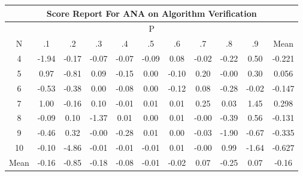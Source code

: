 \documentclass[11pt,a4paper]{report}
\begin{document}
\begin{longtable}{ | c || c | c | c | c | c | c | c | c | c || c |}
\hline
\multicolumn{11}{|c|}{ Score Report For ANA on Algorithm Verification} \\
\hline
\multicolumn{11}{|c|}{ P } \\
\hline
N & .1 & .2 & .3 & .4 & .5 & .6 & .7 & .8 & .9 & Mean\\
 \hline
 \hline
 \endhead
  4 &  \cellcolor[HTML]{FFCFCF} -1.94 &  \cellcolor[HTML]{FFF7F7} -0.17 &  \cellcolor[HTML]{FFFFFF} -0.07 &  \cellcolor[HTML]{FFFFFF} -0.07 &  \cellcolor[HTML]{FFFFFF} -0.09 &  \cellcolor[HTML]{FFFFFF} 0.08 &  \cellcolor[HTML]{FFFFFF} -0.02 &  \cellcolor[HTML]{FFF7F7} -0.22 &  \cellcolor[HTML]{EFEFFF} 0.50 & -0.221 \\
  5 &  \cellcolor[HTML]{E7E7FF} 0.97 &  \cellcolor[HTML]{FFE7E7} -0.81 &  \cellcolor[HTML]{FFFFFF} 0.09 &  \cellcolor[HTML]{FFFFFF} -0.15 &  \cellcolor[HTML]{FFFFFF} 0.00 &  \cellcolor[HTML]{FFFFFF} -0.10 &  \cellcolor[HTML]{F7F7FF} 0.20 &  \cellcolor[HTML]{FFFFFF} -0.00 &  \cellcolor[HTML]{F7F7FF} 0.30 & 0.056 \\
  6 &  \cellcolor[HTML]{FFEFEF} -0.53 &  \cellcolor[HTML]{FFF7F7} -0.38 &  \cellcolor[HTML]{FFFFFF} 0.00 &  \cellcolor[HTML]{FFFFFF} -0.08 &  \cellcolor[HTML]{FFFFFF} 0.00 &  \cellcolor[HTML]{FFFFFF} -0.12 &  \cellcolor[HTML]{FFFFFF} 0.08 &  \cellcolor[HTML]{FFF7F7} -0.28 &  \cellcolor[HTML]{FFFFFF} -0.02 & -0.147 \\
  7 &  \cellcolor[HTML]{E7E7FF} 1.00 &  \cellcolor[HTML]{FFF7F7} -0.16 &  \cellcolor[HTML]{FFFFFF} 0.10 &  \cellcolor[HTML]{FFFFFF} -0.01 &  \cellcolor[HTML]{FFFFFF} 0.01 &  \cellcolor[HTML]{FFFFFF} 0.01 &  \cellcolor[HTML]{F7F7FF} 0.25 &  \cellcolor[HTML]{FFFFFF} 0.03 &  \cellcolor[HTML]{D7D7FF} 1.45 & 0.298 \\
  8 &  \cellcolor[HTML]{FFFFFF} -0.09 &  \cellcolor[HTML]{FFFFFF} 0.10 &  \cellcolor[HTML]{FFDFDF} -1.37 &  \cellcolor[HTML]{FFFFFF} 0.01 &  \cellcolor[HTML]{FFFFFF} 0.00 &  \cellcolor[HTML]{FFFFFF} 0.01 &  \cellcolor[HTML]{FFFFFF} -0.00 &  \cellcolor[HTML]{FFF7F7} -0.39 &  \cellcolor[HTML]{EFEFFF} 0.56 & -0.131 \\
  9 &  \cellcolor[HTML]{FFF7F7} -0.46 &  \cellcolor[HTML]{F7F7FF} 0.32 &  \cellcolor[HTML]{FFFFFF} -0.00 &  \cellcolor[HTML]{FFF7F7} -0.28 &  \cellcolor[HTML]{FFFFFF} 0.01 &  \cellcolor[HTML]{FFFFFF} 0.00 &  \cellcolor[HTML]{FFFFFF} -0.03 &  \cellcolor[HTML]{FFCFCF} -1.90 &  \cellcolor[HTML]{FFEFEF} -0.67 & -0.335 \\
  10 &  \cellcolor[HTML]{FFFFFF} -0.10 &  \cellcolor[HTML]{FF8787} -4.86 &  \cellcolor[HTML]{FFFFFF} -0.01 &  \cellcolor[HTML]{FFFFFF} -0.01 &  \cellcolor[HTML]{FFFFFF} -0.01 &  \cellcolor[HTML]{FFFFFF} 0.01 &  \cellcolor[HTML]{FFFFFF} -0.00 &  \cellcolor[HTML]{E7E7FF} 0.99 &  \cellcolor[HTML]{FFD7D7} -1.64 & -0.627 \\
 \hline
 \hline
Mean &  \cellcolor[HTML]{FFF7F7} -0.16 &  \cellcolor[HTML]{FFE7E7} -0.85 &  \cellcolor[HTML]{FFF7F7} -0.18 &  \cellcolor[HTML]{FFFFFF} -0.08 &  \cellcolor[HTML]{FFFFFF} -0.01 &  \cellcolor[HTML]{FFFFFF} -0.02 &  \cellcolor[HTML]{FFFFFF} 0.07 &  \cellcolor[HTML]{FFF7F7} -0.25 &  \cellcolor[HTML]{FFFFFF} 0.07 &  \cellcolor[HTML]{FFFFFF} -0.16
\end{longtable}
\end{document}
